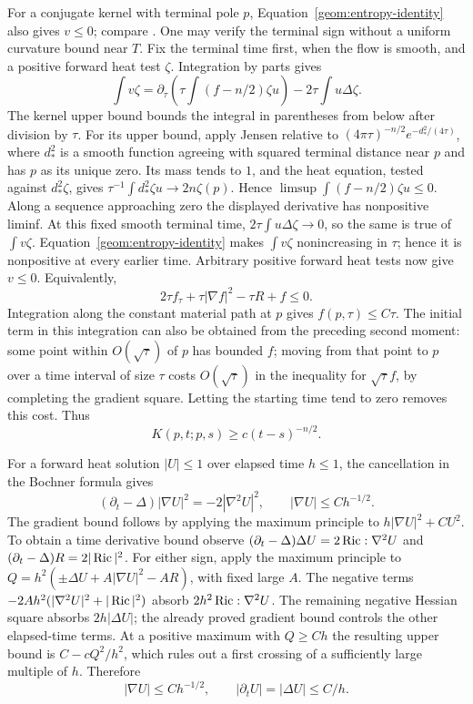 For a conjugate kernel with terminal pole $p$,
Equation~\eqref{geom:entropy-identity} also gives $v\leq0$; compare
\cite[Corollaries~9.3--9.4]{PerelmanEntropy}.
One may verify the terminal sign without a uniform curvature bound
near $T$. Fix the terminal time first, when the flow is smooth, and a
positive forward heat test $\zeta$. Integration by parts gives
\[
 \int v\zeta
 =\partial_\tau\left(\tau\int(f-n/2)\zeta u\right)
       -2\tau\int u\Delta\zeta.
\]
The kernel upper bound bounds the integral in parentheses from below
after division by $\tau$. For its upper bound, apply Jensen relative
to $(4\pi\tau)^{-n/2}e^{-d_*^2/(4\tau)}$, where $d_*^2$ is a smooth
function agreeing with squared terminal distance near $p$ and has
$p$ as its unique zero. Its mass tends to $1$, and the heat equation,
tested against $d_*^2\zeta$, gives
$\tau^{-1}\int d_*^2\zeta u\to2n\zeta(p)$. Hence
$\limsup\int(f-n/2)\zeta u\leq0$. Along a sequence approaching zero
the displayed derivative has nonpositive liminf. At this fixed smooth
terminal time, $2\tau\int u\Delta\zeta\to0$, so the same is true of
$\int v\zeta$. Equation~\eqref{geom:entropy-identity} makes
$\int v\zeta$ nonincreasing in $\tau$; hence it is nonpositive at
every earlier time. Arbitrary positive forward heat tests now give
$v\leq0$. Equivalently,
\[
 2\tau f_\tau+\tau|\nabla f|^2-\tau R+f\leq0.
\]
Integration along the constant material path at $p$ gives
$f(p,\tau)\leq C\tau$. The initial term in this integration can
also be obtained from the preceding second moment: some point within
$O(\sqrt\tau)$ of $p$ has bounded $f$; moving from that point to $p$
over a time interval of size $\tau$ costs $O(\sqrt\tau)$ in the
inequality for $\sqrt\tau f$, by completing the gradient square.
Letting the starting time tend to zero removes this cost. Thus
\begin{equation}\label{geom:kernel-diagonal}
 K(p,t;p,s)\geq c(t-s)^{-n/2}.
\end{equation}

For a forward heat solution $|U|\leq1$ over elapsed time $h\leq1$,
the cancellation in the Bochner formula gives
\[
 (\partial_t-\Delta)|\nabla U|^2=-2|\nabla^2U|^2,
 \qquad |\nabla U|\leq Ch^{-1/2}.
\]
The gradient bound follows by applying the maximum principle to
$h|\nabla U|^2+CU^2$. To obtain a time derivative bound observe
$ (\partial_t-\Delta)\Delta U=2\operatorname{Ric}:\nabla^2U$ and
$ (\partial_t-\Delta)R=2|\operatorname{Ric}|^2$. For either sign, apply the
maximum principle to
$Q=h^2(\pm\Delta U+A|\nabla U|^2-AR)$, with fixed large $A$.
The negative terms $-2Ah^2(|\nabla^2U|^2+|\operatorname{Ric}|^2)$ absorb
$2h^2\operatorname{Ric}:\nabla^2U$. The remaining negative Hessian square
absorbs $2h|\Delta U|$; the already proved gradient bound controls
the other elapsed-time terms. At a positive maximum with $Q\geq C h$
the resulting upper bound is $C-cQ^2/h^2$, which rules out a first
crossing of a sufficiently large multiple of $h$. Therefore
\begin{equation}\label{geom:heat-derivatives}
 |\nabla U|\leq Ch^{-1/2},\qquad |\partial_tU|=|\Delta U|\leq C/h.
\end{equation}

